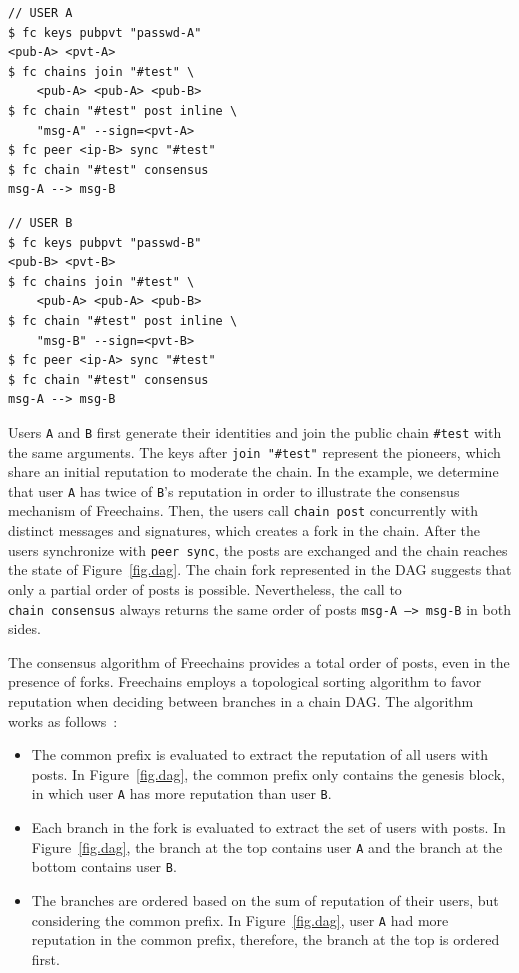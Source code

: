 \documentclass[12pt]{article}
\newcommand{\code}[1]  {\texttt{\footnotesize{#1}}}
\begin{document}
\noindent
{\footnotesize
\begin{minipage}[t]{0.5\textwidth}
\begin{verbatim}
// USER A
$ fc keys pubpvt "passwd-A"
<pub-A> <pvt-A>
$ fc chains join "#test" \
    <pub-A> <pub-A> <pub-B>
$ fc chain "#test" post inline \
    "msg-A" --sign=<pvt-A>
$ fc peer <ip-B> sync "#test"
$ fc chain "#test" consensus
msg-A --> msg-B
\end{verbatim}
\end{minipage}
\begin{minipage}[t]{0.5\textwidth}
\begin{verbatim}
// USER B
$ fc keys pubpvt "passwd-B"
<pub-B> <pvt-B>
$ fc chains join "#test" \
    <pub-A> <pub-A> <pub-B>
$ fc chain "#test" post inline \
    "msg-B" --sign=<pvt-B>
$ fc peer <ip-A> sync "#test"
$ fc chain "#test" consensus
msg-A --> msg-B
\end{verbatim}
\end{minipage}
}

Users \code{A} and \code{B} first generate their identities and join the
public chain \code{\#test} with the same arguments.
The keys after \code{join~"\#test"} represent the pioneers, which share an
initial reputation to moderate the chain.
In the example, we determine that user \code{A} has twice of \code{B}'s
reputation in order to illustrate the consensus mechanism of Freechains.
Then, the users call \code{chain~post} concurrently with distinct messages and
signatures, which creates a fork in the chain.
%
After the users synchronize with \code{peer~sync}, the posts are exchanged and
the chain reaches the state of Figure~\ref{fig.dag}.
The chain fork represented in the DAG suggests that only a partial order of
posts is possible.
Nevertheless, the call to \code{chain~consensus} always returns the same order
of posts \code{msg-A~-->~msg-B} in both sides.

The consensus algorithm of Freechains provides a total order of posts, even in
the presence of forks.
Freechains employs a topological sorting algorithm to favor reputation when
deciding between branches in a chain DAG.
The algorithm works as follows~\cite{fcs.sbseg20}:
\begin{itemize}
\item
    The common prefix is evaluated to extract the reputation of all users with
    posts.
    In Figure~\ref{fig.dag}, the common prefix only contains the genesis
    block, in which user \code{A} has more reputation than user \code{B}.
\item
    Each branch in the fork is evaluated to extract the set of users with
    posts.
    In Figure~\ref{fig.dag}, the branch at the top contains user \code{A} and
    the branch at the bottom contains user \code{B}.
\item
    The branches are ordered based on the sum of reputation of their users, but
    considering the common prefix.
    In Figure~\ref{fig.dag}, user \code{A} had more reputation in the common
    prefix, therefore, the branch at the top is ordered first.
\end{itemize}
\end{document}
